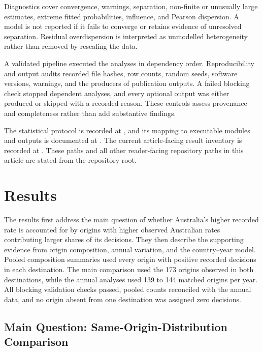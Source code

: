 \documentclass[runningheads]{llncs}
\begin{document}
Diagnostics cover convergence, warnings, separation, non-finite or unusually large estimates, extreme fitted probabilities, influence, and Pearson dispersion. A model is not reported if it fails to converge or retains evidence of unresolved separation. Residual overdispersion is interpreted as unmodelled heterogeneity rather than removed by rescaling the data.

A validated pipeline executed the analyses in dependency order. Reproducibility and output audits recorded file hashes, row counts, random seeds, software versions, warnings, and the producers of publication outputs. A failed blocking check stopped dependent analyses, and every optional output was either produced or skipped with a recorded reason. These controls assess provenance and completeness rather than add substantive findings.

The statistical protocol is recorded at , and its mapping to executable modules and outputs is documented at . The current article-facing result inventory is recorded at . These paths and all other reader-facing repository paths in this article are stated from the repository root.

\section{Results}

The results first address the main question of whether Australia's higher recorded rate is accounted for by origins with higher observed Australian rates contributing larger shares of its decisions. They then describe the supporting evidence from origin composition, annual variation, and the country--year model. Pooled composition summaries used every origin with positive recorded decisions in each destination. The main comparison used the 173 origins observed in both destinations, while the annual analyses used 139 to 144 matched origins per year. All blocking validation checks passed, pooled counts reconciled with the annual data, and no origin absent from one destination was assigned zero decisions.

\subsection{Main Question: Same-Origin-Distribution Comparison}
\end{document}
